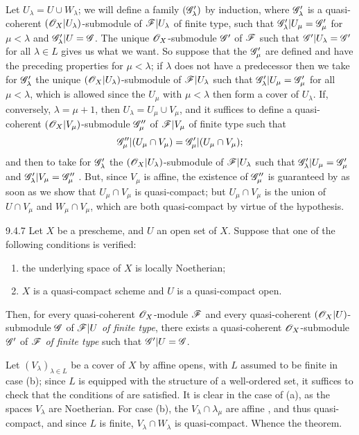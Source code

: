 Let $U_\lambda=U\cup W_\lambda$; we will define a family $(\mathscr{G}'_\lambda)$ by induction,
where $\mathscr{G}'_\lambda$ is a quasi-coherent $(\mathscr{O}_X|U_\lambda)$-submodule of
$\mathscr{F}|U_\lambda$ of finite type, such that $\mathscr{G}'_\lambda|U_\mu=\mathscr{G}'_\mu$ for
$\mu<\lambda$ and $\mathscr{G}'_\lambda|U=\mathscr{G}$. The unique $\mathscr{O}_X$-submodule $\mathscr{G}'$ of
$\mathscr{F}$ such that $\mathscr{G}'|U_\lambda=\mathscr{G}'$ for all $\lambda\in L$  gives
us what we want. So suppose that the $\mathscr{G}'_\mu$ are defined and have the preceding
properties for $\mu<\lambda$; if $\lambda$ does not have a predecessor then we take for
$\mathscr{G}'_\lambda$ the unique $(\mathscr{O}_X|U_\lambda)$-submodule of $\mathscr{F}|U_\lambda$ such that
$\mathscr{G}'_\lambda|U_\mu=\mathscr{G}'_\mu$ for all $\mu<\lambda$, which is allowed since the $U_\mu$
with $\mu<\lambda$ then form a cover of $U_\lambda$. If, conversely, $\lambda=\mu+1$, then
$U_\lambda=U_\mu\cup V_\mu$, and it suffices to define a quasi-coherent
$(\mathscr{O}_X|V_\mu)$-submodule $\mathscr{G}''_\mu$ of $\mathscr{F}|V_\mu$ of finite type such that
\[
  \mathscr{G}''_\mu|(U_\mu\cap V_\mu)=\mathscr{G}'_\mu|(U_\mu\cap V_\mu);
\]
and then to take for $\mathscr{G}'_\lambda$ the $(\mathscr{O}_X|U_\lambda)$-submodule of
$\mathscr{F}|U_\lambda$ such that $\mathscr{G}'_\lambda|U_\mu=\mathscr{G}'_\mu$ and
$\mathscr{G}'_\lambda|V_\mu=\mathscr{G}''_\mu$ . But, since $V_\mu$ is affine, the
existence of $\mathscr{G}''_\mu$ is guaranteed by  as soon as we show that
$U_\mu\cap V_\mu$ is quasi-compact; but $U_\mu\cap V_\mu$ is the union of $U\cap V_\mu$ and
$W_\mu\cap V_\mu$, which are both quasi-compact by virtue of the hypothesis.

\begin{envs}[Theorem]{9.4.7}
\label{thm-1.9.4.7}
Let $X$ be a prescheme, and $U$ an open set of $X$. Suppose that one of the following
conditions is verified:
\begin{enumerate}[label=\rm{(\alph*)}]
  \item the underlying space of $X$ is locally Noetherian;
  \item $X$ is a quasi-compact scheme and $U$ is a quasi-compact open.
\end{enumerate}
Then, for every quasi-coherent $\mathscr{O}_X$-module $\mathscr{F}$ and every quasi-coherent
$(\mathscr{O}_X|U)$-submodule $\mathscr{G}$ of $\mathscr{F}|U$ \emph{of finite type}, there exists a
quasi-coherent $\mathscr{O}_X$-submodule $\mathscr{G}'$ of $\mathscr{F}$ \emph{of finite type} such that
$\mathscr{G}'|U=\mathscr{G}$.
\end{envs}

Let
$(V_\lambda)_{\lambda\in L}$ be a cover of $X$ by affine opens, with $L$ assumed to be finite
in case (b); since $L$ is equipped with the structure of a well-ordered set, it suffices to
check that the conditions of  are satisfied. It is clear in the case of (a),
as the spaces $V_\lambda$ are Noetherian. For case (b), the $V_\lambda\cap\lambda_\mu$ are
affine , and thus quasi-compact, and since $L$ is finite,
$V_\lambda\cap W_\lambda$ is quasi-compact. Whence the theorem.

